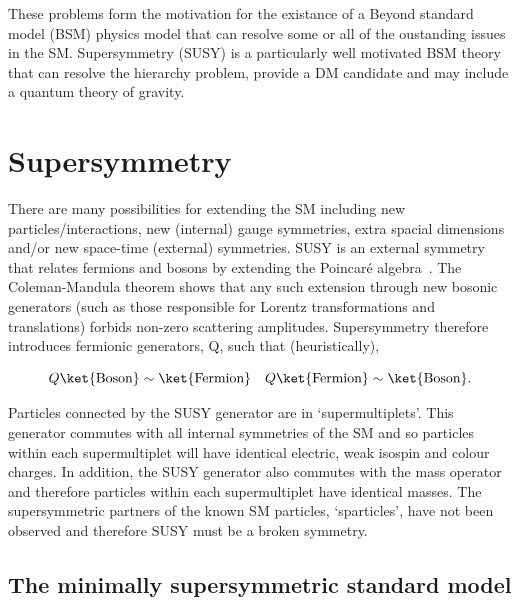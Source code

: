 These problems form the motivation for the existance of a Beyond standard model (BSM) physics model that
can resolve some or all of the oustanding issues in the SM. Supersymmetry (SUSY) is a particularly
well motivated BSM theory that can resolve the hierarchy problem, provide a DM candidate
and may include a quantum theory of gravity.

\section{Supersymmetry}

There are many possibilities for extending the SM including new particles/interactions, new (internal) gauge symmetries, 
extra spacial dimensions and/or new space-time (external) symmetries. SUSY is 
an external symmetry that relates fermions and bosons by extending the Poincar\'{e} algebra~\cite{SUSYC}. 
The Coleman-Mandula theorem shows that any such extension through new bosonic generators (such as those responsible for Lorentz 
transformations and translations) forbids non-zero scattering amplitudes. 
Supersymmetry therefore introduces fermionic generators, Q, such that (heuristically),

\begin{equation}
Q\ket{\text{Boson}} \sim \ket{\text{Fermion}} \quad Q\ket{\text{Fermion}} \sim \ket{\text{Boson}}.
\end{equation}

Particles connected by the SUSY generator are in `supermultiplets'. This generator commutes with all internal symmetries 
of the SM and so particles within each supermultiplet will have identical electric, weak isospin and colour charges.
In addition, the SUSY generator also commutes with the mass operator and therefore 
particles within each supermultiplet have identical masses. The supersymmetric partners of the 
known SM particles, `sparticles', have not been observed and therefore SUSY must be a broken symmetry.

%

\subsection{The minimally supersymmetric standard model}

